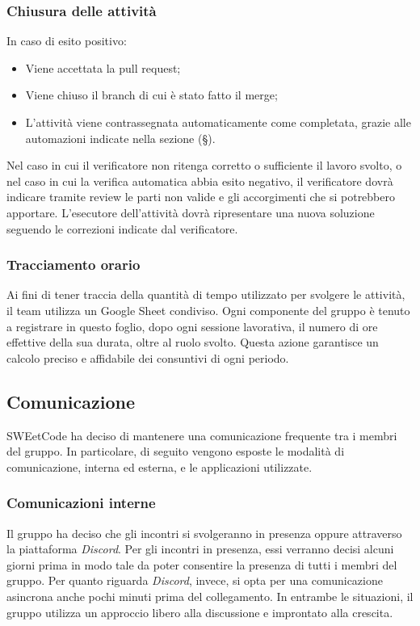 \documentclass[10pt, a4paper]{article}
\begin{document}
\subsubsection{Chiusura delle attività}
In caso di esito positivo:
\begin{itemize}
    \item Viene accettata la pull request;
    \item Viene chiuso il branch di cui è stato fatto il merge;
    \item L'attività viene contrassegnata automaticamente come completata, grazie alle automazioni indicate nella sezione (\S {}).
\end{itemize}
Nel caso in cui il verificatore non ritenga corretto o sufficiente il lavoro svolto, o nel caso in cui la verifica automatica abbia esito negativo, il verificatore dovrà indicare tramite review le parti non valide e gli accorgimenti che si potrebbero apportare.
L'esecutore dell'attività dovrà ripresentare una nuova soluzione seguendo le correzioni indicate dal verificatore.

\subsubsection{Tracciamento orario}
Ai fini di tener traccia della quantità di tempo utilizzato per svolgere le attività, il team utilizza un Google Sheet condiviso.
Ogni componente del gruppo è tenuto a registrare in questo foglio, dopo ogni sessione lavorativa, il numero di ore effettive della sua durata, oltre al ruolo svolto.
Questa azione garantisce un calcolo preciso e affidabile dei consuntivi di ogni periodo. 

\subsection{Comunicazione}
SWEetCode ha deciso di mantenere una comunicazione frequente tra i membri del gruppo. In particolare, di seguito vengono esposte le modalità di comunicazione, interna ed esterna, e le applicazioni utilizzate.

\subsubsection{Comunicazioni interne}

Il gruppo ha deciso che gli incontri si svolgeranno  in presenza oppure attraverso la piattaforma \textit{Discord}. Per gli incontri in presenza, essi verranno decisi alcuni giorni prima in modo tale da poter consentire la presenza di tutti i membri del gruppo. Per quanto riguarda \textit{Discord}, invece, si opta per una comunicazione asincrona anche pochi minuti prima del collegamento. In entrambe le situazioni, il gruppo utilizza un approccio libero alla discussione e improntato alla crescita.
\end{document}

